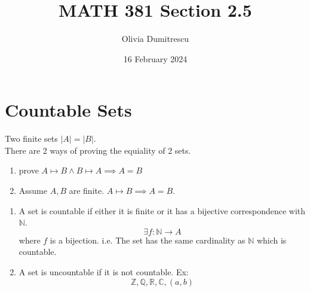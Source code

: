 \documentclass[letterpaper, 12pt]{article}
\title{MATH 381 Section 2.5}
\author{Olivia Dumitrescu}
\date{16 February 2024}
\newenvironment{definition}[1][Definition]{\begin{trivlist}
\item[\hskip \labelsep {\bfseries #1}]}{\end{trivlist}}
\newenvironment{remark}[1][Remark]{\begin{trivlist}
\item[\hskip \labelsep {\bfseries #1}]}{\end{trivlist}}
\begin{document}
    \maketitle
    \section*{Countable Sets}
    \begin{remark}
        Two finite sets $|A| = |B|$. \\
        There are 2 ways of proving the equiality of 2 sets.
        \begin{enumerate}
            \item prove $A \mapsto B \wedge B \mapsto A \implies A = B$
            \item Assume $A, B$ are finite. $A \mapsto B \implies A = B$.
        \end{enumerate}
    \end{remark}
    \begin{definition}
        \begin{enumerate}
            \item A set is countable if either it is finite or it has a bijective correspondence with 
            $\mathbb{N}$.
            \[\exists f: \mathbb{N} \rightarrow A\]
            where $f$ is a bijection.
            i.e. The set has the same cardinality as $\mathbb{N}$ which is countable.
            \item A set is uncountable if it is not countable. Ex:
            \[\mathbb{Z}, \mathbb{Q}, \mathbb{R}, \mathbb{C}, (a, b)\]
        \end{enumerate}
    \end{definition}
\end{document}
